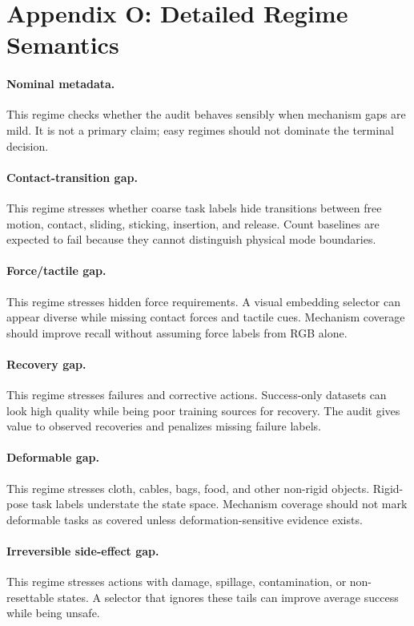 \documentclass{article}
\begin{document}
\section{Appendix O: Detailed Regime Semantics}
\paragraph{Nominal metadata.}
This regime checks whether the audit behaves sensibly when mechanism gaps are mild. It is not a primary claim; easy regimes should not dominate the terminal decision.

\paragraph{Contact-transition gap.}
This regime stresses whether coarse task labels hide transitions between free motion, contact, sliding, sticking, insertion, and release. Count baselines are expected to fail because they cannot distinguish physical mode boundaries.

\paragraph{Force/tactile gap.}
This regime stresses hidden force requirements. A visual embedding selector can appear diverse while missing contact forces and tactile cues. Mechanism coverage should improve recall without assuming force labels from RGB alone.

\paragraph{Recovery gap.}
This regime stresses failures and corrective actions. Success-only datasets can look high quality while being poor training sources for recovery. The audit gives value to observed recoveries and penalizes missing failure labels.

\paragraph{Deformable gap.}
This regime stresses cloth, cables, bags, food, and other non-rigid objects. Rigid-pose task labels understate the state space. Mechanism coverage should not mark deformable tasks as covered unless deformation-sensitive evidence exists.

\paragraph{Irreversible side-effect gap.}
This regime stresses actions with damage, spillage, contamination, or non-resettable states. A selector that ignores these tails can improve average success while being unsafe.
\end{document}
